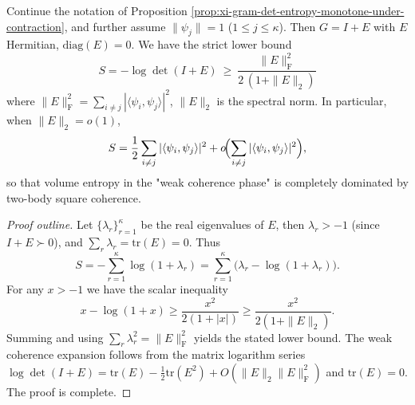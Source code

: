 \begin{proposition}\label{prop:xi-gram-entropy-lower-bound-by-coherence}
Continue the notation of Proposition \ref{prop:xi-gram-det-entropy-monotone-under-contraction}, and further assume \(\|\psi_j\|=1\) (\(1\le j\le\kappa\)).
Then \(G=I+E\) with \(E\) Hermitian, \(\mathrm{diag}(E)=0\).
We have the strict lower bound
\[
\boxed{\;
S=-\log\det(I+E)\ \ge\ \frac{\|E\|_{\mathrm F}^{2}}{2\,(1+\|E\|_{2})}\;}
\]
where \(\|E\|_{\mathrm F}^{2}=\sum_{i\neq j}|\langle\psi_i,\psi_j\rangle|^2\), \(\|E\|_2\) is the spectral norm.
In particular, when \(\|E\|_2=o(1)\),
\[
S=\frac12\sum_{i\neq j}|\langle\psi_i,\psi_j\rangle|^2+o\!\Bigl(\sum_{i\neq j}|\langle\psi_i,\psi_j\rangle|^2\Bigr),
\]
so that volume entropy in the "weak coherence phase" is completely dominated by two-body square coherence.
\end{proposition}
\begin{proof}[Proof outline]
Let \(\{\lambda_r\}_{r=1}^\kappa\) be the real eigenvalues of \(E\), then \(\lambda_r>-1\) (since \(I+E\succ0\)), and \(\sum_r\lambda_r=\mathrm{tr}(E)=0\).
Thus
\[
S=-\sum_{r=1}^\kappa\log(1+\lambda_r)=\sum_{r=1}^\kappa\bigl(\lambda_r-\log(1+\lambda_r)\bigr).
\]
For any \(x>-1\) we have the scalar inequality
\[
x-\log(1+x)\ge \frac{x^2}{2(1+|x|)}\ge \frac{x^2}{2(1+\|E\|_2)}.
\]
Summing and using \(\sum_r\lambda_r^2=\|E\|_{\mathrm F}^2\) yields the stated lower bound.
The weak coherence expansion follows from the matrix logarithm series
\(
\log\det(I+E)=\mathrm{tr}(E)-\frac12\mathrm{tr}(E^2)+O(\|E\|_2\|E\|_{\mathrm F}^2)
\)
and \(\mathrm{tr}(E)=0\). The proof is complete.
\end{proof}

